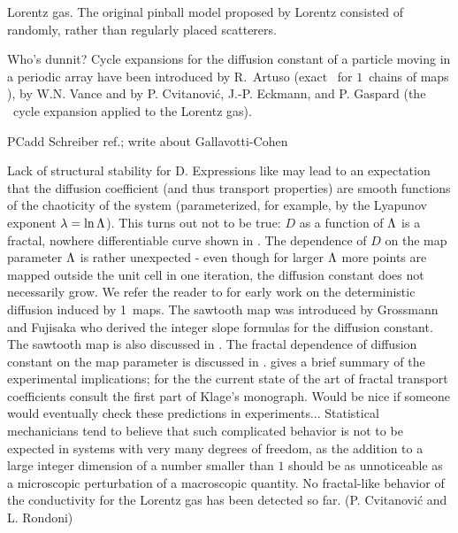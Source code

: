 {Lorentz gas.}{
The original pinball model proposed by Lorentz consisted
of randomly, rather than regularly placed scatterers.
} %
%


{Who's dunnit?}{
Cycle expansions for the diffusion constant of a particle
moving in a periodic array have been introduced
by R.~Artuso (exact
\dzeta\ for $1$\dmn\ chains of maps  ),
by W.N. Vance%
\PublicPrivate{,}{%
(the trace formula \refeq{DL-trace} for the Lorentz gas),
      }%
and by
P. Cvitanovi\'c, J.-P. Eckmann, and P. Gaspard
(the \dzeta\ cycle expansion  applied to the  Lorentz gas).
} %

PC{add Schreiber ref.; write about Gallavotti-Cohen}

{Lack of structural stability for D.}{
Expressions like  may lead to an expectation that
the diffusion coefficient (and thus transport properties) are
smooth functions of the chaoticity of the system
(parameterized, for example, by the Lyapunov exponent $\lambda =
\ln \Lambda$). This turns out not to be true: $D$ as a
function of $\Lambda$ is a fractal, nowhere differentiable
curve shown in . The dependence of $D$ on the
map parameter $\Lambda$ is rather unexpected - even though for
larger $\Lambda$ more points are mapped outside the unit cell
in one iteration, the diffusion constant does not necessarily
grow. We refer the reader to  for
early work on the deterministic diffusion induced by 1\dmn\
maps. The sawtooth map  was introduced by
Grossmann and Fujisaka who derived the integer slope
formulas  for the diffusion constant. The sawtooth
map is also discussed in . The fractal dependence
of diffusion constant on the map parameter is discussed in
.  gives
a brief summary of the experimental implications; for the the
current state of the art of fractal transport coefficients consult
the first part of Klage's monograph\rf{RKbook07}. Would be nice if
someone would eventually check these predictions in
experiments...
Statistical
mechanicians tend to believe that such complicated behavior is
not to be expected in systems with very many degrees of
freedom, as the addition to a large integer dimension of a
number smaller than $1$ should be as unnoticeable as a
microscopic perturbation of a macroscopic quantity. No
fractal-like behavior of the conductivity for the Lorentz gas
has been detected so far.
\hfill (P. Cvitanovi\'c and L. Rondoni)
} %

